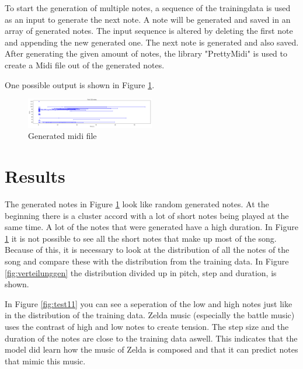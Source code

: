 To start the generation of multiple notes, a sequence of the trainingdata is used as an input to generate the next note.
A note will be generated and saved in an array of generated notes. The input sequence is altered by deleting the first
note and appending the new generated one. The next note is generated and also saved. After generating the given
amount of notes, the library "PrettyMidi" is used to create a Midi file out of the generated notes.

One possible output is shown in Figure \ref{fig:genNotes}. 


\begin{figure}
\centering
\includegraphics[width=0.5\textwidth]{./pics/genNotes.PNG}
\caption{Generated midi file}
\label{fig:genNotes}    
\end{figure}

\section{Results}
\label{res}

The generated notes in Figure \ref{fig:genNotes} look like random generated notes. At the beginning there is 
a cluster accord with a lot of short notes being played at the same time. A lot of the notes that were generated have 
a high duration. In Figure \ref{fig:genNotes} it is not possible to see all the short notes that make up most of
the song. Because of this, it is necessary to look at the distribution of all the notes of the song and compare these 
with the distribution from the training data. In Figure \ref{fig:verteilunggen} the distribution divided up in 
pitch, step and duration, is shown. 

In Figure \ref{fig:test11} you can see a seperation of the low and high notes just like in the distribution of the training
data. Zelda music (especially the battle music) uses the contrast of high and low notes to create tension. The step size and 
the duration of the notes are close to the training data aswell. This indicates that the model did learn how the music
of Zelda is composed and that it can predict notes that mimic this music.

